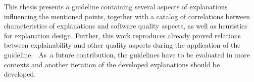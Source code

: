 This thesis presents a guideline containing several aspects of explanations influencing the mentioned points, together with a catalog of correlations between characteristics of explanations and software quality aspects, as well as heuristics for explanation design. Further, this work reproduces already proved relations between explainability and other quality aspects during the application of the guideline.  As a future contribution, the guidelines have to be evaluated in more contexts and another iteration of the developed explanations should be developed.

\clearpage
